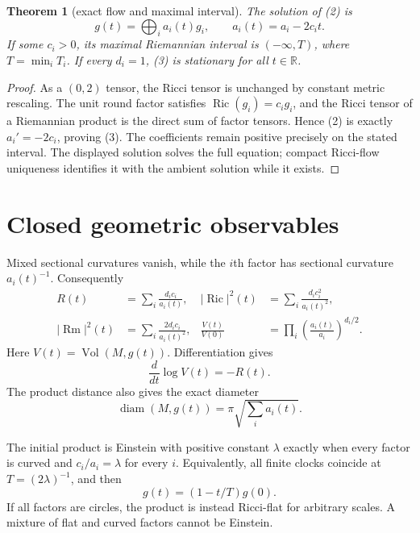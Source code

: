 \documentclass[10pt]{article}
\newtheorem{theorem}{Theorem}
\newcommand{\Ric}{\operatorname{Ric}}
\newcommand{\Rm}{\operatorname{Rm}}
\newcommand{\Vol}{\operatorname{Vol}}
\newcommand{\diam}{\operatorname{diam}}
\newcommand{\R}{\mathbb R}
\begin{document}
\begin{theorem}[exact flow and maximal interval]\label{thm:flow}
The solution of (2) is
\begin{equation}
 g(t)=\bigoplus_i a_i(t)g_i,\qquad a_i(t)=a_i-2c_it.       \tag{3}
\end{equation}
If some $c_i>0$, its maximal Riemannian interval is $(-\infty,T)$, where
$T=\min_iT_i$.  If every $d_i=1$, (3) is stationary for all $t\in\R$.
\end{theorem}
\begin{proof}
As a $(0,2)$ tensor, the Ricci tensor is unchanged by constant metric
rescaling.  The unit round factor satisfies $\Ric(g_i)=c_i g_i$, and the Ricci
tensor of a Riemannian product is the direct sum of factor tensors.  Hence
(2) is exactly $a_i'=-2c_i$, proving (3).  The coefficients remain positive
precisely on the stated interval.  The displayed solution solves the full
equation; compact Ricci-flow uniqueness identifies it with the ambient
solution while it exists.
\end{proof}

\section{Closed geometric observables}
Mixed sectional curvatures vanish, while the $i$th factor has sectional
curvature $a_i(t)^{-1}$.  Consequently
\begin{align}
 R(t)&=\sum_i\frac{d_ic_i}{a_i(t)},
 &|\Ric|^2(t)&=\sum_i\frac{d_ic_i^2}{a_i(t)^2},             \tag{4}\\
 |\Rm|^2(t)&=\sum_i\frac{2d_ic_i}{a_i(t)^2},
 &\frac{V(t)}{V(0)}&=\prod_i\left(\frac{a_i(t)}{a_i}\right)^{d_i/2}.
                                                                    \tag{5}
\end{align}
Here $V(t)=\Vol(M,g(t))$.  Differentiation gives
\begin{equation}
 \frac{d}{dt}\log V(t)=-R(t).                              \tag{6}
\end{equation}
The product distance also gives the exact diameter
\begin{equation}
 \diam(M,g(t))=\pi\sqrt{\sum_i a_i(t)}.                    \tag{7}
\end{equation}

The initial product is Einstein with positive constant $\lambda$ exactly when
every factor is curved and $c_i/a_i=\lambda$ for every $i$.  Equivalently,
all finite clocks coincide at $T=(2\lambda)^{-1}$, and then
\begin{equation}
 g(t)=(1-t/T)g(0).                                         \tag{8}
\end{equation}
If all factors are circles, the product is instead Ricci-flat for arbitrary
scales.  A mixture of flat and curved factors cannot be Einstein.
\end{document}
